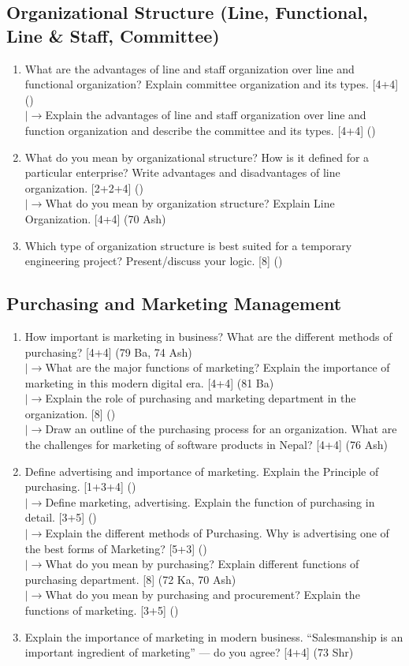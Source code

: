 \documentclass[12pt]{article}
\newcommand{\lb}{\\$\left|\rightarrow\right.$}
\begin{document}
  \subsection{Organizational Structure (Line, Functional, Line \& Staff, Committee)}
    \begin{enumerate}[topsep=0pt, noitemsep]
      \item What are the advantages of line and staff organization over line and functional organization? Explain committee organization and its types. \hfill [4+4] ()
        \lb Explain the advantages of line and staff organization over line and function organization and describe the committee and its types. \hfill [4+4] ()

      \item What do you mean by organizational structure? How is it defined for a particular enterprise? Write advantages and disadvantages of line organization. \hfill [2+2+4] ()
        \lb What do you mean by organization structure? Explain Line Organization. \hfill [4+4] (70 Ash)

      \item Which type of organization structure is best suited for a temporary engineering project? Present/discuss your logic. \hfill [8] ()
    \end{enumerate}

  \subsection{Purchasing and Marketing Management}
    \begin{enumerate}[topsep=0pt, noitemsep]
      \item How important is marketing in business? What are the different methods of purchasing? \hfill [4+4] (79 Ba, 74 Ash)
        \lb What are the major functions of marketing? Explain the importance of marketing in this modern digital era. \hfill [4+4] (81 Ba)
        \lb Explain the role of purchasing and marketing department in the organization. \hfill [8] ()
        \lb Draw an outline of the purchasing process for an organization. What are the challenges for marketing of software products in Nepal? \hfill [4+4] (76 Ash)

      \item Define advertising and importance of marketing. Explain the Principle of purchasing. \hfill [1+3+4] ()
        \lb Define marketing, advertising. Explain the function of purchasing in detail. \hfill [3+5] ()
        \lb Explain the different methods of Purchasing. Why is advertising one of the best forms of Marketing? \hfill [5+3] ()
        \lb What do you mean by purchasing? Explain different functions of purchasing department. \hfill [8] (72 Ka, 70 Ash)
        \lb What do you mean by purchasing and procurement? Explain the functions of marketing. \hfill [3+5] ()

      \item Explain the importance of marketing in modern business. ``Salesmanship is an important ingredient of marketing'' --- do you agree? \hfill [4+4] (73 Shr)
    \end{enumerate}
\end{document}
